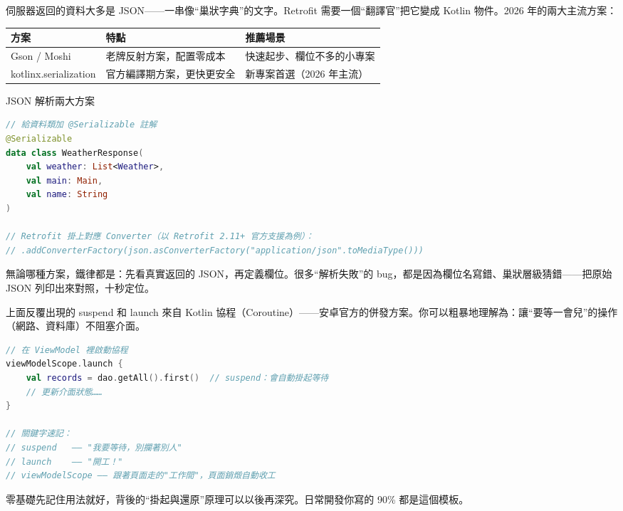
伺服器返回的資料大多是 JSON——一串像“巢狀字典”的文字。Retrofit 需要一個“翻譯官”把它變成 Kotlin 物件。2026 年的兩大主流方案：

\begin{center}
\begin{tabularx}{\linewidth}{|X|X|X|}
\hline
\textbf{方案} & \textbf{特點} & \textbf{推薦場景} \tabularnewline
\hline
Gson / Moshi & 老牌反射方案，配置零成本 & 快速起步、欄位不多的小專案 \tabularnewline
kotlinx.serialization & 官方編譯期方案，更快更安全 & 新專案首選（2026 年主流） \tabularnewline
\hline
\end{tabularx}
\end{center}

\begin{center}\small\color{gray}JSON 解析兩大方案\end{center}

\begin{lstlisting}[language=Kotlin]
// 給資料類加 @Serializable 註解
@Serializable
data class WeatherResponse(
    val weather: List<Weather>,
    val main: Main,
    val name: String
)

// Retrofit 掛上對應 Converter（以 Retrofit 2.11+ 官方支援為例）：
// .addConverterFactory(json.asConverterFactory("application/json".toMediaType()))
\end{lstlisting}

無論哪種方案，鐵律都是：先看真實返回的 JSON，再定義欄位。很多“解析失敗”的 bug，都是因為欄位名寫錯、巢狀層級猜錯——把原始 JSON 列印出來對照，十秒定位。



上面反覆出現的 suspend 和 launch 來自 Kotlin 協程（Coroutine）——安卓官方的併發方案。你可以粗暴地理解為：讓“要等一會兒”的操作（網路、資料庫）不阻塞介面。

\begin{lstlisting}[language=Kotlin]
// 在 ViewModel 裡啟動協程
viewModelScope.launch {
    val records = dao.getAll().first()  // suspend：會自動掛起等待
    // 更新介面狀態……
}

// 關鍵字速記：
// suspend   —— "我要等待，別攔著別人"
// launch    —— "開工！"
// viewModelScope —— 跟著頁面走的"工作間"，頁面銷燬自動收工
\end{lstlisting}

零基礎先記住用法就好，背後的“掛起與還原”原理可以以後再深究。日常開發你寫的 90\% 都是這個模板。

